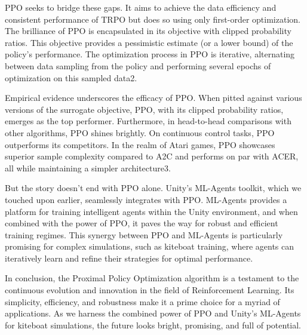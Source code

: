 PPO seeks to bridge these gaps. It aims to achieve the data efficiency and consistent performance of TRPO but does so using only first-order optimization. The brilliance of PPO is encapsulated in its objective with clipped probability ratios. This objective provides a pessimistic estimate (or a lower bound) of the policy's performance. The optimization process in PPO is iterative, alternating between data sampling from the policy and performing several epochs of optimization on this sampled data2.

Empirical evidence underscores the efficacy of PPO. When pitted against various versions of the surrogate objective, PPO, with its clipped probability ratios, emerges as the top performer. Furthermore, in head-to-head comparisons with other algorithms, PPO shines brightly. On continuous control tasks, PPO outperforms its competitors. In the realm of Atari games, PPO showcases superior sample complexity compared to A2C and performs on par with ACER, all while maintaining a simpler architecture3.

But the story doesn't end with PPO alone. Unity's ML-Agents toolkit, which we touched upon earlier, seamlessly integrates with PPO. ML-Agents provides a platform for training intelligent agents within the Unity environment, and when combined with the power of PPO, it paves the way for robust and efficient training regimes. This synergy between PPO and ML-Agents is particularly promising for complex simulations, such as kiteboat training, where agents can iteratively learn and refine their strategies for optimal performance.

In conclusion, the Proximal Policy Optimization algorithm is a testament to the continuous evolution and innovation in the field of Reinforcement Learning. Its simplicity, efficiency, and robustness make it a prime choice for a myriad of applications. As we harness the combined power of PPO and Unity's ML-Agents for kiteboat simulations, the future looks bright, promising, and full of potential.




